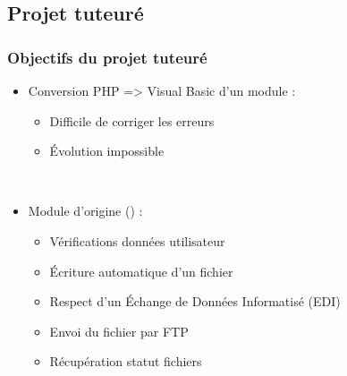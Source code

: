\subsection{Projet tuteuré}

\begin{frame}
	\frametitle{Objectifs du projet tuteuré}
	
	\begin{itemize}
		\item Conversion PHP => Visual Basic d'un module :
			\begin{itemize}
				\item Difficile de corriger les erreurs
				\item \'Evolution impossible
			\end{itemize}~
			
		\item Module d'origine () :
			\begin{itemize}
				\item Vérifications données utilisateur\sautligne
				
				\item \'Ecriture automatique d'un fichier
				\item Respect d'un \'Echange de Données Informatisé (EDI)\sautligne
				
				\item Envoi du fichier par FTP\sautligne
				
				\item Récupération statut fichiers
			\end{itemize}
	\end{itemize}
\end{frame}
